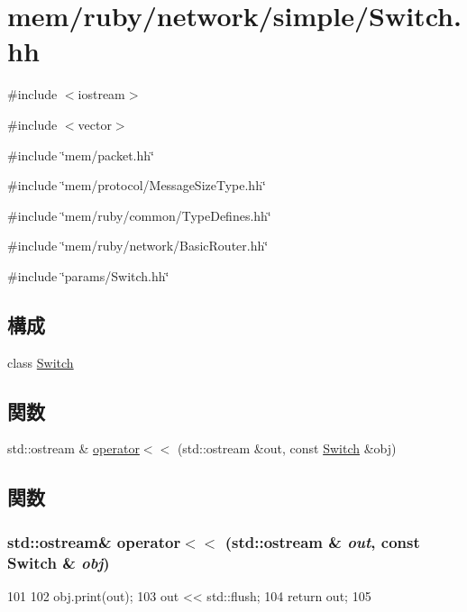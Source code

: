 \hypertarget{Switch_8hh}{
\section{mem/ruby/network/simple/Switch.hh}
\label{Switch_8hh}
}
{\ttfamily \#include $<$iostream$>$}\par
{\ttfamily \#include $<$vector$>$}\par
{\ttfamily \#include \char`\"{}mem/packet.hh\char`\"{}}\par
{\ttfamily \#include \char`\"{}mem/protocol/MessageSizeType.hh\char`\"{}}\par
{\ttfamily \#include \char`\"{}mem/ruby/common/TypeDefines.hh\char`\"{}}\par
{\ttfamily \#include \char`\"{}mem/ruby/network/BasicRouter.hh\char`\"{}}\par
{\ttfamily \#include \char`\"{}params/Switch.hh\char`\"{}}\par
\subsection*{構成}
\begin{DoxyCompactItemize}
\item 
class \hyperlink{classSwitch}{Switch}
\end{DoxyCompactItemize}
\subsection*{関数}
\begin{DoxyCompactItemize}
\item 
std::ostream \& \hyperlink{Switch_8hh_ab44ec0990c8a707fd833f52556c0a441}{operator$<$$<$} (std::ostream \&out, const \hyperlink{classSwitch}{Switch} \&obj)
\end{DoxyCompactItemize}


\subsection{関数}
\hypertarget{Switch_8hh_ab44ec0990c8a707fd833f52556c0a441}{
\subsubsection[{operator$<$$<$}]{\setlength{\rightskip}{0pt plus 5cm}std::ostream\& operator$<$$<$ (std::ostream \& {\em out}, \/  const {\bf Switch} \& {\em obj})}}
\label{Switch_8hh_ab44ec0990c8a707fd833f52556c0a441}



\begin{DoxyCode}
101 {
102     obj.print(out);
103     out << std::flush;
104     return out;
105 }
\end{DoxyCode}
